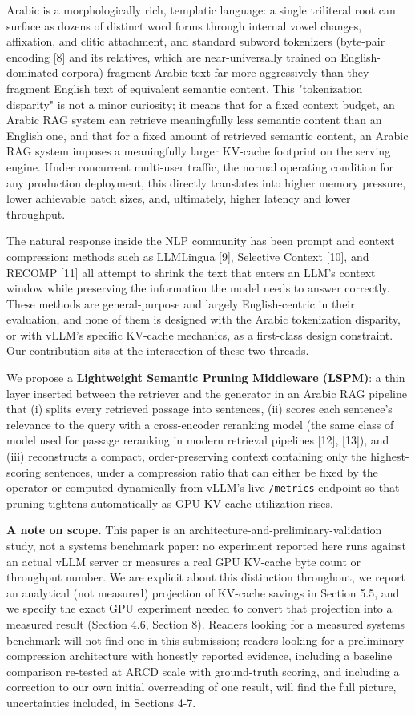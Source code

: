 \documentclass[pdflatex,sn-basic,Numbered]{sn-jnl}
\begin{document}
Arabic is a morphologically rich, templatic language: a single triliteral root can surface as dozens of distinct word forms through internal vowel changes, affixation, and clitic attachment, and standard subword tokenizers (byte-pair encoding [8] and its relatives, which are near-universally trained on English-dominated corpora) fragment Arabic text far more aggressively than they fragment English text of equivalent semantic content. This "tokenization disparity" is not a minor curiosity; it means that for a fixed context budget, an Arabic RAG system can retrieve meaningfully less semantic content than an English one, and that for a fixed amount of retrieved semantic content, an Arabic RAG system imposes a meaningfully larger KV-cache footprint on the serving engine. Under concurrent multi-user traffic, the normal operating condition for any production deployment, this directly translates into higher memory pressure, lower achievable batch sizes, and, ultimately, higher latency and lower throughput.

The natural response inside the NLP community has been prompt and context compression: methods such as LLMLingua [9], Selective Context [10], and RECOMP [11] all attempt to shrink the text that enters an LLM's context window while preserving the information the model needs to answer correctly. These methods are general-purpose and largely English-centric in their evaluation, and none of them is designed with the Arabic tokenization disparity, or with vLLM's specific KV-cache mechanics, as a first-class design constraint. Our contribution sits at the intersection of these two threads.

We propose a \textbf{Lightweight Semantic Pruning Middleware (LSPM)}: a thin layer inserted between the retriever and the generator in an Arabic RAG pipeline that (i) splits every retrieved passage into sentences, (ii) scores each sentence's relevance to the query with a cross-encoder reranking model (the same class of model used for passage reranking in modern retrieval pipelines [12], [13]), and (iii) reconstructs a compact, order-preserving context containing only the highest-scoring sentences, under a compression ratio that can either be fixed by the operator or computed dynamically from vLLM's live \texttt{/metrics} endpoint so that pruning tightens automatically as GPU KV-cache utilization rises.

\textbf{A note on scope.} This paper is an architecture-and-preliminary-validation study, not a systems benchmark paper: no experiment reported here runs against an actual vLLM server or measures a real GPU KV-cache byte count or throughput number. We are explicit about this distinction throughout, we report an analytical (not measured) projection of KV-cache savings in Section 5.5, and we specify the exact GPU experiment needed to convert that projection into a measured result (Section 4.6, Section 8). Readers looking for a measured systems benchmark will not find one in this submission; readers looking for a preliminary compression architecture with honestly reported evidence, including a baseline comparison re-tested at ARCD scale with ground-truth scoring, and including a correction to our own initial overreading of one result, will find the full picture, uncertainties included, in Sections 4-7.
\end{document}
